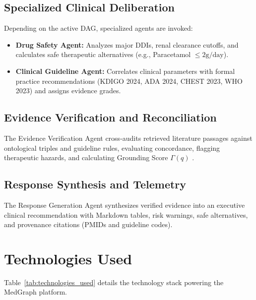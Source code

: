 \documentclass[conference]{IEEEtran}
\begin{document}
\subsection{Specialized Clinical Deliberation}
Depending on the active DAG, specialized agents are invoked:
\begin{itemize}
    \item \textbf{Drug Safety Agent:} Analyzes major DDIs, renal clearance cutoffs, and calculates safe therapeutic alternatives (e.g., Paracetamol $\le 2\text{g/day}$).
    \item \textbf{Clinical Guideline Agent:} Correlates clinical parameters with formal practice recommendations (KDIGO 2024, ADA 2024, CHEST 2023, WHO 2023) and assigns evidence grades.
\end{itemize}

\subsection{Evidence Verification and Reconciliation}
The Evidence Verification Agent cross-audits retrieved literature passages against ontological triples and guideline rules, evaluating concordance, flagging therapeutic hazards, and calculating Grounding Score $\Gamma(q)$ \cite{LAWANNA2026100926}.

\subsection{Response Synthesis and Telemetry}
The Response Generation Agent synthesizes verified evidence into an executive clinical recommendation with Markdown tables, risk warnings, safe alternatives, and provenance citations (PMIDs and guideline codes).

\section{Technologies Used}

Table~\ref{tab:technologies_used} details the technology stack powering the MedGraph platform.
\end{document}
